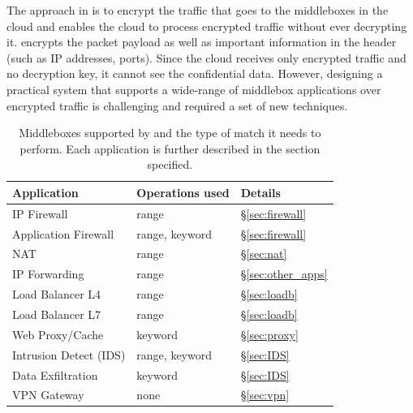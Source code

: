     The approach in \sys is to encrypt the traffic that goes to  the middleboxes in the cloud and enables the cloud to process encrypted traffic without ever decrypting it. \sys encrypts the packet payload as well as important information in the header (such as IP addresses, ports). Since the cloud receives only encrypted traffic and no decryption key, it cannot see the confidential data. However, designing a practical system that supports a wide-range of middlebox applications over encrypted traffic is challenging and required a set of new techniques.
    
    
    
    
\begin{table}[t!]
\centering
\begin{tabular}{p{3.2cm}|p{2.9cm}|p{1cm}}
{\bf Application}  & {\bf Operations used} & {\bf Details} \\
\hline \hline
IP Firewall &   range  & \S\ref{sec:firewall} \\
Application Firewall & range, keyword  & \S\ref{sec:firewall}\\
NAT & range  & \S\ref{sec:nat} \\
IP Forwarding  & range & \S\ref{sec:other_apps} \\
Load Balancer L4 & range & \S\ref{sec:loadb}\\
Load Balancer L7  & range & \S\ref{sec:loadb}\\
Web Proxy/Cache  & keyword & \S\ref{sec:proxy}\\
Intrusion Detect (IDS)  & range, keyword & \S\ref{sec:IDS}\\
Data Exfiltration  & keyword & \S\ref{sec:IDS} \\
VPN Gateway &  none & \S\ref{sec:vpn} \\ 
\end{tabular}
\caption{Middleboxes supported by \sys and the type of match it needs to perform. Each application is further described in the section specified. \label{tab:apps-ops} }

\end{table}

